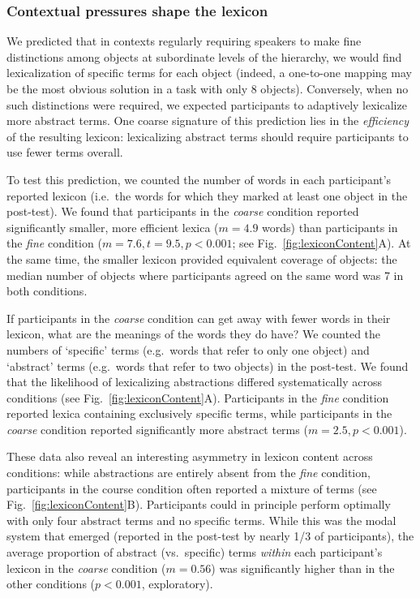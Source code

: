\subsubsection{Contextual pressures shape the lexicon}

We predicted that in contexts regularly requiring speakers to make fine distinctions among objects at subordinate levels of the hierarchy, we would find lexicalization of specific terms for each object (indeed, a one-to-one mapping may be the most obvious solution in a task with only 8 objects). Conversely, when no such distinctions were required, we expected participants to adaptively lexicalize more abstract terms. One coarse signature of this prediction lies in the \emph{efficiency} of the resulting lexicon: lexicalizing abstract terms should require participants to use fewer terms overall.

To test this prediction, we counted the number of words in each participant's reported lexicon (i.e.\ the words for which they marked at least one object in the post-test). We found that participants in the \emph{coarse} condition reported significantly smaller, more efficient lexica ($m = 4.9$ words) than participants in the \emph{fine} condition ($m = 7.6, t = 9.5, p < 0.001$; see Fig.\ \ref{fig:lexiconContent}A). At the same time, the smaller lexicon provided equivalent coverage of objects: the median number of objects where participants agreed on the same word was 7 in both conditions. 

If participants in the \emph{coarse} condition can get away with fewer words in their lexicon, what are the meanings of the words they do have? We counted the numbers of `specific' terms (e.g.\ words that refer to only one object) and `abstract' terms (e.g.\ words that refer to two objects) in the post-test. We found that the likelihood of lexicalizing abstractions differed systematically across conditions (see Fig.\ \ref{fig:lexiconContent}A). Participants in the \emph{fine} condition reported lexica containing exclusively specific terms, while participants in the \emph{coarse} condition reported significantly more abstract terms ($m = 2.5, p < 0.001$). 

These data also reveal an interesting asymmetry in lexicon content across conditions: while abstractions are entirely absent from the \emph{fine} condition, participants in the course condition often reported a mixture of terms (see Fig.\ \ref{fig:lexiconContent}B). Participants could in principle perform optimally with only four abstract terms and no specific terms. While this was the modal system that emerged (reported in the post-test by nearly 1/3 of participants), the average proportion of abstract (vs.\ specific) terms \emph{within} each participant's lexicon in the \emph{coarse} condition ($m = 0.56$) was significantly higher than in the other conditions ($p < 0.001$, exploratory).

